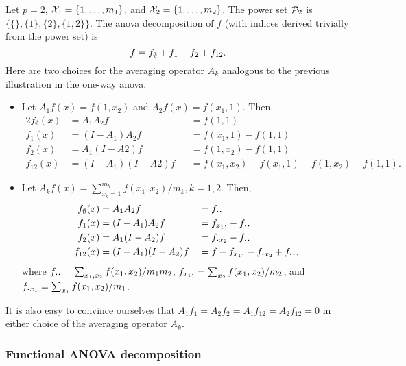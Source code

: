 \begin{example}
  Let $p=2$, ${\mathcal X}_1=\{1,\dots,m_1\}$, and ${\mathcal X}_2=\{1,\dots,m_2\}$.
  The power set ${\mathcal P}_2$ is $\big\{ \{\}, \{1\}, \{2\}, \{1,2\} \big\}$.
  The \gls*{anova} decomposition of $f$ (with indices derived trivially from the power set) is
  \vspace{-0.3em}
  \[
    f = f_\emptyset + f_1 + f_2 + f_{12}.\vspace{-0.5em}
  \]
  Here are two choices for the averaging operator $A_k$ analogous to the previous illustration in the one-way \gls*{anova}.
    \begin{itemize}[noitemsep]
    \item Let $A_1f(x) = f(1,x_2)$ and $A_2f(x) = f(x_1,1)$. Then,
    \begin{alignat*}{2}
      f_\emptyset(x) &= A_1A_2 f          &&= f(1,1) \\
      f_1(x) &= (I-A_1)A_2f       &&= f(x_1,1) - f(1,1) \\
      f_2(x) &= A_1(I-A2)f        &&= f(1,x_2) - f(1,1) \\
      f_{12}(x) &= (I-A_1)(I-A2)f &&= f(x_1,x_2) - f(x_1,1) - f(1,x_2) + f(1,1). 
    \end{alignat*}
    
    \item Let $A_kf(x) = \sum_{x_k=1}^{m_k} f(x_1,x_2) / m_k, k=1,2$. Then,
    \begin{alignat*}{2}
      f_\emptyset(x) &= A_1A_2 f          &&= f_{\bigcdot\bigcdot} \\
      f_1(x) &= (I-A_1)A_2f       &&= f_{x_1\bigcdot} - f_{\bigcdot\bigcdot} \\
      f_2(x) &= A_1(I-A_2)f        &&= f_{\bigcdot x_2} - f_{\bigcdot\bigcdot} \\
      f_{12}(x) &= (I-A_1)(I-A_2)f &&= f - f_{x_1\bigcdot} - f_{\bigcdot x_2} + f_{\bigcdot\bigcdot},
    \end{alignat*}
    where $f_{\bigcdot\bigcdot} = \sum_{x_1,x_2} f(x_1,x_2) / m_1m_2$, $ f_{x_1\bigcdot} = \sum_{x_2} f(x_1,x_2)/m_2$, and \newline $f_{\bigcdot x_1} = \sum_{x_1} f(x_1,x_2)/m_1$.
  \end{itemize}
  
  It is also easy to convince ourselves that $A_1f_1 = A_2f_2 = A_1f_{12} = A_2f_{12} = 0$ in either choice of the averaging operator $A_k$.
\end{example}

\subsubsection{Functional ANOVA decomposition}

